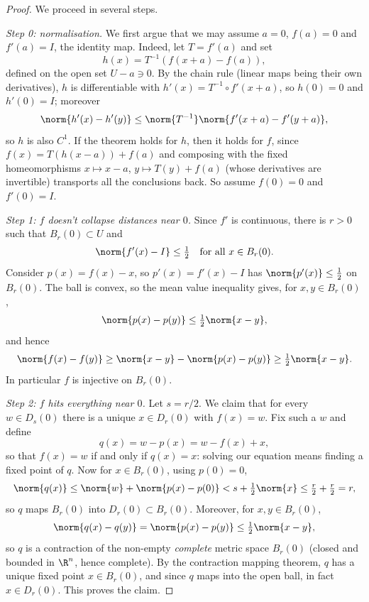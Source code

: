 \begin{proof}
    We proceed in several steps.

    \emph{Step 0: normalisation.} We first argue that we may assume $a = 0$, $f(a) = 0$ and $f'(a) = I$, the identity map. Indeed, let $T = f'(a)$ and set
    $$
    h(x) = T^{-1}\left(f(x + a) - f(a)\right),
    $$
    defined on the open set $U - a \ni 0$. By the chain rule (linear maps being their own derivatives), $h$ is differentiable with $h'(x) = T^{-1} \circ f'(x + a)$, so $h(0) = 0$ and $h'(0) = I$; moreover
    $$
    \norm{h'(x) - h'(y)} \leq \norm{T^{-1}}\norm{f'(x + a) - f'(y + a)},
    $$
    so $h$ is also $C^1$. If the theorem holds for $h$, then it holds for $f$, since $f(x) = T(h(x - a)) + f(a)$ and composing with the fixed homeomorphisms $x \mapsto x - a$, $y \mapsto T(y) + f(a)$ (whose derivatives are invertible) transports all the conclusions back. So assume $f(0) = 0$ and $f'(0) = I$.

    \emph{Step 1: $f$ doesn't collapse distances near $0$.} Since $f'$ is continuous, there is $r > 0$ such that $B_r(0) \subset U$ and
    $$
    \norm{f'(x) - I} \leq \tfrac{1}{2} \quad \text{for all } x \in B_r(0).
    $$
    Consider $p(x) = f(x) - x$, so $p'(x) = f'(x) - I$ has $\norm{p'(x)} \leq \frac{1}{2}$ on $B_r(0)$. The ball is convex, so the mean value inequality gives, for $x, y \in B_r(0)$,
    $$
    \norm{p(x) - p(y)} \leq \tfrac{1}{2}\norm{x - y},
    $$
    and hence
    $$
    \norm{f(x) - f(y)} \geq \norm{x - y} - \norm{p(x) - p(y)} \geq \tfrac{1}{2}\norm{x - y}.
    $$
    In particular $f$ is injective on $B_r(0)$.

    \emph{Step 2: $f$ hits everything near $0$.} Let $s = r/2$. We claim that for every $w \in D_s(0)$ there is a unique $x \in D_r(0)$ with $f(x) = w$. Fix such a $w$ and define
    $$
    q(x) = w - p(x) = w - f(x) + x,
    $$
    so that $f(x) = w$ if and only if $q(x) = x$: solving our equation means finding a fixed point of $q$. Now for $x \in B_r(0)$, using $p(0) = 0$,
    $$
    \norm{q(x)} \leq \norm{w} + \norm{p(x) - p(0)} < s + \tfrac{1}{2}\norm{x} \leq \tfrac{r}{2} + \tfrac{r}{2} = r,
    $$
    so $q$ maps $B_r(0)$ into $D_r(0) \subset B_r(0)$. Moreover, for $x, y \in B_r(0)$,
    $$
    \norm{q(x) - q(y)} = \norm{p(x) - p(y)} \leq \tfrac{1}{2}\norm{x - y},
    $$
    so $q$ is a contraction of the non-empty \emph{complete} metric space $B_r(0)$ (closed and bounded in $\R^n$, hence complete). By the contraction mapping theorem, $q$ has a unique fixed point $x \in B_r(0)$, and since $q$ maps into the open ball, in fact $x \in D_r(0)$. This proves the claim.


\end{proof}
